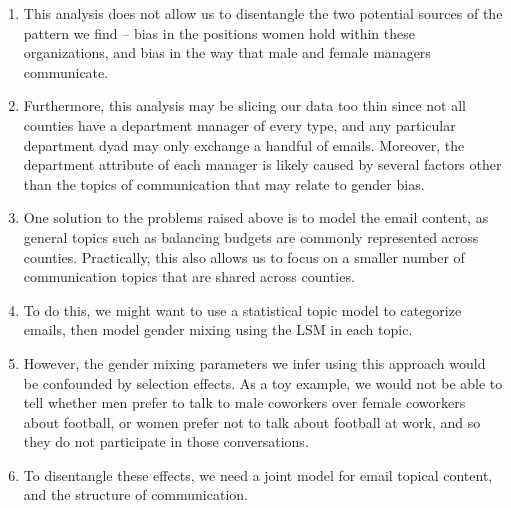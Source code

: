 \documentclass[fleqn]{MJDArticle}
\begin{document}
\begin{enumerate}
	\item This analysis does not allow us to disentangle the two potential sources of the pattern we find -- bias in the positions women hold within these organizations, and bias in the way that male and female managers communicate. 
	
	\item Furthermore, this analysis may be slicing our data too thin since not all counties have a department manager of every type, and any particular department dyad may only exchange a handful of emails. Moreover, the department attribute of each manager is likely caused by several factors other than the topics of communication that may relate to gender bias. 
	
	\item One solution to the problems raised above is to model the email content, as general topics such as balancing budgets are commonly represented across counties. Practically, this also allows us to focus on a smaller number of communication topics that are shared across counties.
	
	\item To do this, we might want to use a statistical topic model to categorize emails, then model  gender mixing using the LSM in each topic.
	
	\item However, the gender mixing parameters we infer using this approach would be confounded by selection effects. As a toy example, we would not be able to tell whether men prefer to talk to male coworkers over female coworkers about football, or women prefer not to talk about football at work, and so they do not participate in those conversations. 
	
	\item To disentangle these effects, we need a joint model for email topical content, and the structure of communication.
	
\end{enumerate}
	
	
\end{document}
